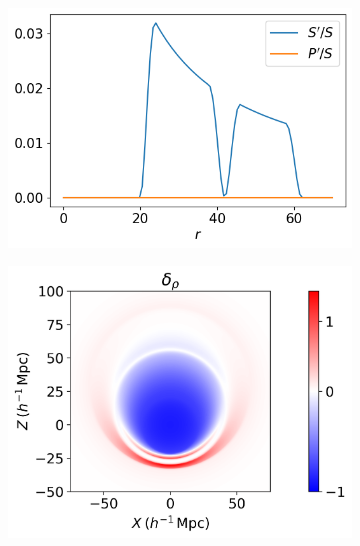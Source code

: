 \documentclass[a4paper,12pt]{report}
\begin{document}
\begin{figure}[!b]
    \centering
    \begin{subfigure}[b]{0.45\textwidth}
        \centering
        \includegraphics[width=\textwidth]{two structures/unrotated/S dash over S.png}
        \caption{}
    \end{subfigure}
    \hfill
    \begin{subfigure}[b]{0.45\textwidth}
        \centering
        \includegraphics[width=\textwidth]{two structures/unrotated/density contrast.png}
        \caption{}
    \end{subfigure}
    \begin{subfigure}[b]{0.45\textwidth}
        \centering

\end{subfigure}
\end{figure}
\end{document}
